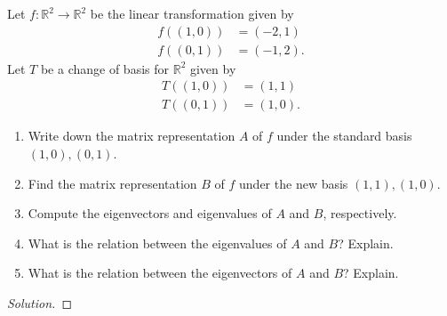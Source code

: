 \documentclass{article}
\newcommand{\R}{\mathbb R}
\newenvironment{problem}[2][Problem]{\begin{trivlist}
\item[\hskip \labelsep {\bfseries #1}\hskip \labelsep {\bfseries #2.}]}{\end{trivlist}}
\newenvironment{solution}
  {\renewcommand{\qedsymbol}{}\begin{proof}[Solution]}
  {\end{proof}}
\begin{document}
\begin{problem}{Additional}
Let $f:\R^2\to \R^2$ be the linear transformation given by
\begin{align*}
f((1,0))&=(-2,1)\\
f((0,1))&=(-1,2).
\end{align*}
Let $T$ be a change of basis for $\R^2$ given by
\begin{align*}
T((1,0))&=(1,1)\\
T((0,1))&=(1,0).
\end{align*}
\begin{enumerate}[label=(\alph*)]
\item Write down the matrix representation $A$ of $f$ under the standard basis $(1,0),(0,1)$.
\item Find the matrix representation $B$ of $f$ under the new basis $(1,1),(1,0)$.
\item Compute the eigenvectors and eigenvalues of $A$ and $B$, respectively.
\item What is the relation between the eigenvalues of $A$ and $B$? Explain.
\item What is the relation between the eigenvectors of $A$ and $B$? Explain.
\end{enumerate}
\end{problem}
\begin{solution}
\end{solution}
\newpage
\end{document}
